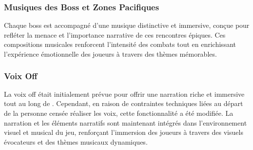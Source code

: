 \subsubsection{Musiques des Boss et Zones Pacifiques}

Chaque boss est accompagné d'une musique distinctive et immersive, conçue pour refléter la menace et l'importance narrative de ces rencontres épiques.
Ces compositions musicales renforcent l'intensité des combats tout en enrichissant l'expérience émotionnelle des joueurs à travers des thèmes mémorables.


\subsubsection{Voix Off}

La voix off était initialement prévue pour offrir une narration riche et immersive tout au long de \gameName.
Cependant, en raison de contraintes techniques liées au départ de la personne censée réaliser les voix, cette fonctionnalité a été modifiée.
La narration et les éléments narratifs sont maintenant intégrés dans l'environnement visuel et musical du jeu, renforçant l'immersion des joueurs à travers des visuels évocateurs et des thèmes musicaux dynamiques.

